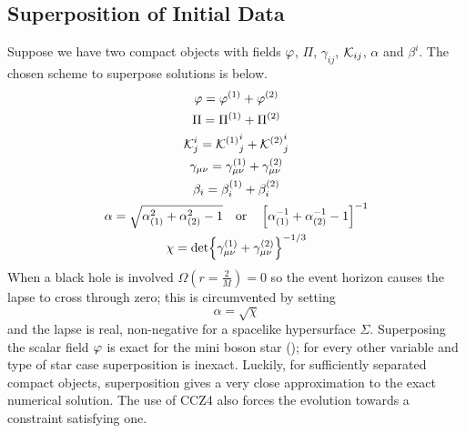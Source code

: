 \subsection{Superposition of Initial Data}
Suppose we have two compact objects with fields $\varphi$, $\Pi$, $\gamma_{ij}$, $\mathcal{K}_{ij}$, $\alpha$ and $\beta^i$. The chosen scheme to superpose solutions is below.
\begin{gather*} \varphi = \varphi^{(1)} + \varphi^{(2)}\\
\Pi = \Pi^{(1)} + \Pi^{(2)}\\
 \mathcal{K}^i_j = {\mathcal{K}^{(1)}}^i_j+{\mathcal{K}^{(2)}}^i_j\\
 \gamma_{\mu\nu} = \gamma^{(1)}_{\mu\nu} + \gamma^{(2)}_{\mu\nu}\\
\beta_i = \beta^{(1)}_i + \beta^{(2)}_i \\
 \alpha = \sqrt{\alpha_{(1)}^2 + \alpha_{(2)}^2-1} \quad \mathrm{or}\quad \left[ \alpha_{(1)}^{-1} +  \alpha_{(2)}^{-1}-1\right]^{-1}\\
 \chi = \det{\gamma^{(1)}_{\mu\nu} + \gamma^{(2)}_{\mu\nu}}^{-1/3}\end{gather*}
When a black hole is involved $\Omega(r=\frac{2}{M})=0$ so the event horizon causes the lapse to cross through zero; this is circumvented by setting
\begin{equation} \alpha = \sqrt{\chi}\end{equation}
and the lapse is real, non-negative for a spacelike hypersurface $\Sigma$. Superposing the scalar field $\varphi$ is exact for the mini boson star (); for every other variable and type of star case superposition is inexact. Luckily, for sufficiently separated compact objects, superposition gives a very close approximation to the exact numerical solution. The use of CCZ4 also forces the evolution towards a constraint satisfying one. 



